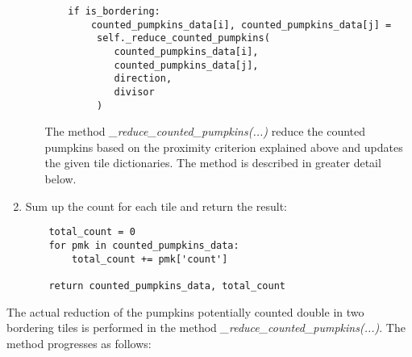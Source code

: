 \documentclass[../Head/Main.tex]{subfiles}
\begin{document}
\begin{enumerate}
\begin{enumerate}
\begin{verbatim}
    if is_bordering:
        counted_pumpkins_data[i], counted_pumpkins_data[j] = 
         self._reduce_counted_pumpkins(
            counted_pumpkins_data[i],
            counted_pumpkins_data[j],
            direction,
            divisor
         )
\end{verbatim}
The method \textit{\_reduce\_counted\_pumpkins(...)} reduce the counted pumpkins based on the proximity criterion explained above and updates the given tile dictionaries. The method is described in greater detail below.
\end{enumerate}
\item Sum up the count for each tile and return the result:
\begin{verbatim}
    total_count = 0
    for pmk in counted_pumpkins_data:
        total_count += pmk['count']
    
    return counted_pumpkins_data, total_count
\end{verbatim}
\end{enumerate}
The actual reduction of the pumpkins potentially counted double in two bordering tiles is performed in the method \textit{\_reduce\_counted\_pumpkins(...)}. The method progresses as follows:
\end{document}
